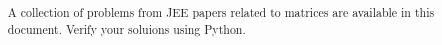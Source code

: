 \documentclass[journal,12pt,twocolumn]{IEEEtran}
\renewcommand\thesection{\arabic{section}}
\begin{document}
\let\StandardTheFigure\thefigure
\renewcommand{\thefigure}{\thesection}



\makeatletter
{}
\makeatother

\let\StandardTheFigure\thefigure
\let\StandardTheTable\thetable
\let\vec\mathbf





\def\putbox#1#2#3{\makebox[0in][l]{\makebox[#1][l]{}\raisebox{\baselineskip}[0in][0in]{\raisebox{#2}[0in][0in]{#3}}}}
     \def\rightbox#1{\makebox[0in][r]{#1}}
     \def\centbox#1{\makebox[0in]{#1}}
     \def\topbox#1{\raisebox{-\baselineskip}[0in][0in]{#1}}
     \def\midbox#1{\raisebox{-0.5\baselineskip}[0in][0in]{#1}}

\vspace{3cm}

\title{ 
}

	

\maketitle


\bigskip

\renewcommand{\thefigure}{\theenumi}
\renewcommand{\thetable}{\theenumi}


\begin{abstract}
	A  collection of problems from JEE papers related to matrices are available in this document.  Verify your soluions using  Python.
\end{abstract}
\end{document}
